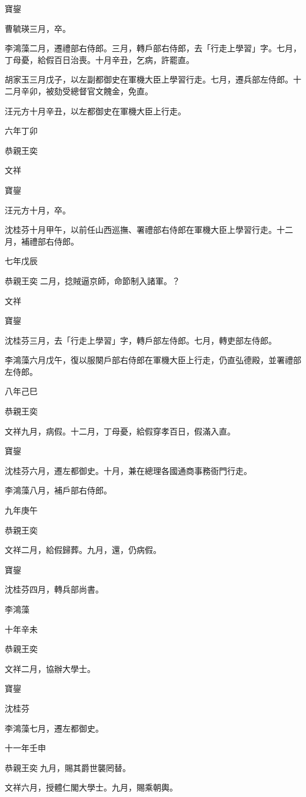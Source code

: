 \begin{pinyinscope}
寶鋆

曹毓瑛三月，卒。

李鴻藻二月，遷禮部右侍郎。三月，轉戶部右侍郎，去「行走上學習」字。七月，丁母憂，給假百日治喪。十月辛丑，乞病，許罷直。

胡家玉三月戊子，以左副都御史在軍機大臣上學習行走。七月，遷兵部左侍郎。十二月辛卯，被劾受總督官文餽金，免直。

汪元方十月辛丑，以左都御史在軍機大臣上行走。

六年丁卯

恭親王奕

文祥

寶鋆

汪元方十月，卒。

沈桂芬十月甲午，以前任山西巡撫、署禮部右侍郎在軍機大臣上學習行走。十二月，補禮部右侍郎。

七年戊辰

恭親王奕二月，捻賊逼京師，命節制入諸軍。？

文祥

寶鋆

沈桂芬三月，去「行走上學習」字，轉戶部左侍郎。七月，轉吏部左侍郎。

李鴻藻六月戊午，復以服闋戶部右侍郎在軍機大臣上行走，仍直弘德殿，並署禮部左侍郎。

八年己巳

恭親王奕

文祥九月，病假。十二月，丁母憂，給假穿孝百日，假滿入直。

寶鋆

沈桂芬六月，遷左都御史。十月，兼在總理各國通商事務衙門行走。

李鴻藻八月，補戶部右侍郎。

九年庚午

恭親王奕

文祥二月，給假歸葬。九月，還，仍病假。

寶鋆

沈桂芬四月，轉兵部尚書。

李鴻藻

十年辛未

恭親王奕

文祥二月，協辦大學士。

寶鋆

沈桂芬

李鴻藻七月，遷左都御史。

十一年壬申

恭親王奕九月，賜其爵世襲罔替。

文祥六月，授體仁閣大學士。九月，賜乘朝輿。


\end{pinyinscope}
